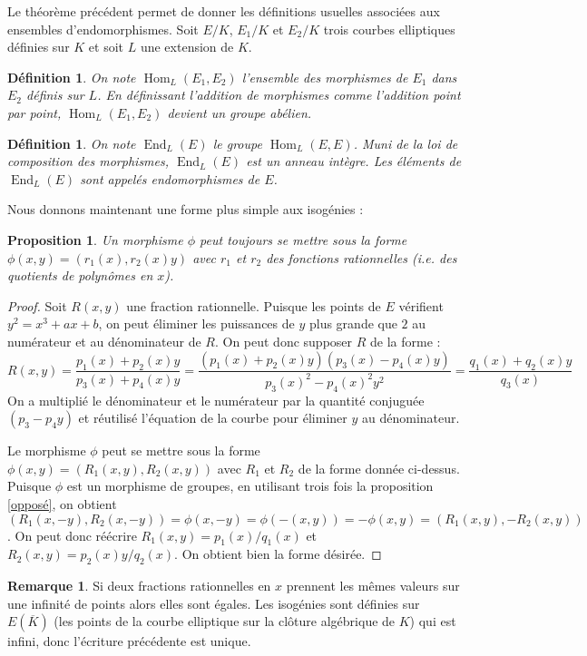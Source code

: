 \documentclass{article}
\theoremstyle{plain}%
\newtheorem{prop}[thm]{Proposition}
\newtheorem{deff}[thm]{Définition}
\theoremstyle{definition}%
\newtheorem{rem}[thm]{Remarque}
\DeclareMathOperator{\End}{End}
\DeclareMathOperator{\Hom}{Hom}
\begin{document}
Le théorème précédent permet de donner les définitions usuelles associées aux ensembles d'endomorphismes. Soit $E/K$, $E_1/K$ et $E_2/K$ trois courbes elliptiques définies sur $K$ et soit $L$ une extension de $K$.

\begin{deff}
  On note $\Hom_L(E_1, E_2)$ l'ensemble des morphismes de $E_1$ dans $E_2$ définis sur $L$. En définissant l'addition de morphismes comme l'addition point par point, $\Hom_L(E_1, E_2)$ devient un groupe abélien.
\end{deff}

\begin{deff}
  On note $\End_L(E)$ le groupe $\Hom_L(E, E)$. Muni de la loi de composition des morphismes, $\End_L(E)$ est un anneau intègre. Les éléments de $\End_L(E)$ sont appelés endomorphismes de $E$.
\end{deff}


 Nous donnons maintenant une forme plus simple aux isogénies :


\begin{prop}
  Un morphisme $\phi$ peut toujours se mettre sous la forme $\phi(x, y) = (r_1(x), r_2(x)y)$ avec $r_1$ et $r_2$ des fonctions rationnelles (i.e. des quotients de polynômes en $x$).
\end{prop}

\begin{proof}
  Soit $R(x, y)$ une fraction rationnelle. Puisque les points de $E$ vérifient $y^2 = x^3 + ax + b$, on peut éliminer les puissances de $y$ plus grande que $2$ au numérateur et au dénominateur de $R$. On peut donc supposer $R$ de la forme : $$R(x, y) = \frac{p_1(x) + p_2(x)y}{p_3(x)+p_4(x)y} = \frac{(p_1(x) + p_2(x)y)(p_3(x)-p_4(x)y)}{p_3(x)^2 - p_4(x)^2y^2} = \frac{q_1(x) +q_2(x)y}{q_3(x)} $$
 On a multiplié le dénominateur et le numérateur par la quantité conjuguée $(p_3-p_4y)$ et réutilisé l'équation de la courbe pour éliminer $y$ au dénominateur.

 Le morphisme $\phi$ peut se mettre sous la forme $\phi(x, y) = (R_1(x, y), R_2(x, y))$ avec $R_1$ et $R_2$ de la forme donnée ci-dessus. Puisque $\phi$ est un morphisme de groupes, en utilisant trois fois la proposition \ref{opposé}, on obtient
 $(R_1(x, -y), R_2(x, -y)) = \phi(x, -y) = \phi(-(x, y)) = -\phi(x, y) = (R_1(x, y), -R_2(x, y))$. On peut donc réécrire $R_1(x, y) = p_1(x) / q_1(x)$ et $R_2(x, y) = p_2(x)y/q_2(x)$. On obtient bien la forme désirée.
\end{proof}

\begin{rem}
  Si deux fractions rationnelles en $x$ prennent les mêmes valeurs sur une infinité de points alors elles sont égales. Les isogénies sont définies sur $E(\overline{K})$ (les points de la courbe elliptique sur la clôture algébrique de $K$) qui est infini, donc l'écriture précédente est unique.
\end{rem}
\end{document}
